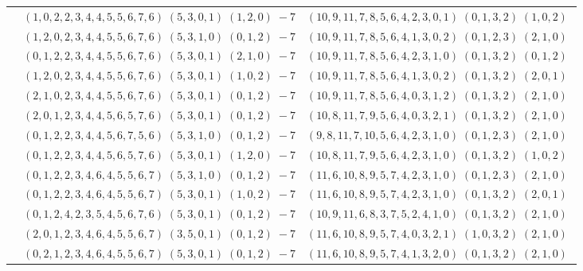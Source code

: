 \documentclass[11pt]{article}
\begin{document}
\begin{longtable}[l]{|c|c|c|}
 \cline{2-3} 
 & $(1 ,0 ,2 ,2 ,3 ,4 ,4 ,5 ,5 ,6 ,7 ,6) \;(5 ,3 ,0 ,1) \;(1 ,2 ,0) \;-7$ & $(10 ,9 ,11 ,7 ,8 ,5 ,6 ,4 ,2 ,3 ,0 ,1) \;(0 ,1 ,3 ,2) \;(1 ,0 ,2) \;$\\ 
 \cline{2-3} 
 & $(1 ,2 ,0 ,2 ,3 ,4 ,4 ,5 ,5 ,6 ,7 ,6) \;(5 ,3 ,1 ,0) \;(0 ,1 ,2) \;-7$ & $(10 ,9 ,11 ,7 ,8 ,5 ,6 ,4 ,1 ,3 ,0 ,2) \;(0 ,1 ,2 ,3) \;(2 ,1 ,0) \;$\\ 
 \cline{2-3} 
 & $(0 ,1 ,2 ,2 ,3 ,4 ,4 ,5 ,5 ,6 ,7 ,6) \;(5 ,3 ,0 ,1) \;(2 ,1 ,0) \;-7$ & $(10 ,9 ,11 ,7 ,8 ,5 ,6 ,4 ,2 ,3 ,1 ,0) \;(0 ,1 ,3 ,2) \;(0 ,1 ,2) \;$\\ 
 \cline{2-3} 
 & $(1 ,2 ,0 ,2 ,3 ,4 ,4 ,5 ,5 ,6 ,7 ,6) \;(5 ,3 ,0 ,1) \;(1 ,0 ,2) \;-7$ & $(10 ,9 ,11 ,7 ,8 ,5 ,6 ,4 ,1 ,3 ,0 ,2) \;(0 ,1 ,3 ,2) \;(2 ,0 ,1) \;$\\ 
 \cline{2-3} 
 & $(2 ,1 ,0 ,2 ,3 ,4 ,4 ,5 ,5 ,6 ,7 ,6) \;(5 ,3 ,0 ,1) \;(0 ,1 ,2) \;-7$ & $(10 ,9 ,11 ,7 ,8 ,5 ,6 ,4 ,0 ,3 ,1 ,2) \;(0 ,1 ,3 ,2) \;(2 ,1 ,0) \;$\\ 
 \cline{2-3} 
 & $(2 ,0 ,1 ,2 ,3 ,4 ,4 ,5 ,6 ,5 ,7 ,6) \;(5 ,3 ,0 ,1) \;(0 ,1 ,2) \;-7$ & $(10 ,8 ,11 ,7 ,9 ,5 ,6 ,4 ,0 ,3 ,2 ,1) \;(0 ,1 ,3 ,2) \;(2 ,1 ,0) \;$\\ 
 \cline{2-3} 
 & $(0 ,1 ,2 ,2 ,3 ,4 ,4 ,5 ,6 ,7 ,5 ,6) \;(5 ,3 ,1 ,0) \;(0 ,1 ,2) \;-7$ & $(9 ,8 ,11 ,7 ,10 ,5 ,6 ,4 ,2 ,3 ,1 ,0) \;(0 ,1 ,2 ,3) \;(2 ,1 ,0) \;$\\ 
 \cline{2-3} 
 & $(0 ,1 ,2 ,2 ,3 ,4 ,4 ,5 ,6 ,5 ,7 ,6) \;(5 ,3 ,0 ,1) \;(1 ,2 ,0) \;-7$ & $(10 ,8 ,11 ,7 ,9 ,5 ,6 ,4 ,2 ,3 ,1 ,0) \;(0 ,1 ,3 ,2) \;(1 ,0 ,2) \;$\\ 
 \cline{2-3} 
 & $(0 ,1 ,2 ,2 ,3 ,4 ,6 ,4 ,5 ,5 ,6 ,7) \;(5 ,3 ,1 ,0) \;(0 ,1 ,2) \;-7$ & $(11 ,6 ,10 ,8 ,9 ,5 ,7 ,4 ,2 ,3 ,1 ,0) \;(0 ,1 ,2 ,3) \;(2 ,1 ,0) \;$\\ 
 \cline{2-3} 
 & $(0 ,1 ,2 ,2 ,3 ,4 ,6 ,4 ,5 ,5 ,6 ,7) \;(5 ,3 ,0 ,1) \;(1 ,0 ,2) \;-7$ & $(11 ,6 ,10 ,8 ,9 ,5 ,7 ,4 ,2 ,3 ,1 ,0) \;(0 ,1 ,3 ,2) \;(2 ,0 ,1) \;$\\ 
 \cline{2-3} 
 & $(0 ,1 ,2 ,4 ,2 ,3 ,5 ,4 ,5 ,6 ,7 ,6) \;(5 ,3 ,0 ,1) \;(0 ,1 ,2) \;-7$ & $(10 ,9 ,11 ,6 ,8 ,3 ,7 ,5 ,2 ,4 ,1 ,0) \;(0 ,1 ,3 ,2) \;(2 ,1 ,0) \;$\\ 
 \cline{2-3} 
 & $(2 ,0 ,1 ,2 ,3 ,4 ,6 ,4 ,5 ,5 ,6 ,7) \;(3 ,5 ,0 ,1) \;(0 ,1 ,2) \;-7$ & $(11 ,6 ,10 ,8 ,9 ,5 ,7 ,4 ,0 ,3 ,2 ,1) \;(1 ,0 ,3 ,2) \;(2 ,1 ,0) \;$\\ 
 \cline{2-3} 
 & $(0 ,2 ,1 ,2 ,3 ,4 ,6 ,4 ,5 ,5 ,6 ,7) \;(5 ,3 ,0 ,1) \;(0 ,1 ,2) \;-7$ & $(11 ,6 ,10 ,8 ,9 ,5 ,7 ,4 ,1 ,3 ,2 ,0) \;(0 ,1 ,3 ,2) \;(2 ,1 ,0) \;$\\ 

\end{longtable}
\end{document}
